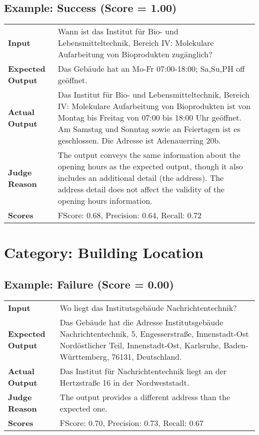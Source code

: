 \documentclass{article}
\begin{document}
\subsection*{Example: Success (Score = 1.00)}
\begin{longtable}{p{} p{}}
\textbf{Input} & Wann ist das Institut für Bio- und Lebensmitteltechnik, Bereich IV: Molekulare Aufarbeitung von Bioprodukten zugänglich? \\
\textbf{Expected Output} & Das Gebäude hat an Mo-Fr 07:00-18:00; Sa,Su,PH off geöffnet. \\
\textbf{Actual Output} & Das Institut für Bio- und Lebensmitteltechnik, Bereich IV: Molekulare Aufarbeitung von Bioprodukten ist von Montag bis Freitag von 07:00 bis 18:00 Uhr geöffnet. Am Samstag und Sonntag sowie an Feiertagen ist es geschlossen. Die Adresse ist Adenauerring 20b. \\
\textbf{Judge Reason} & The output conveys the same information about the opening hours as the expected output, though it also includes an additional detail (the address). The address detail does not affect the validity of the opening hours information. \\
\textbf{Scores} & FScore: 0.68, Precision: 0.64, Recall: 0.72 \\
\end{longtable}
\section*{Category: Building Location}
\subsection*{Example: Failure (Score = 0.00)}
\begin{longtable}{p{} p{}}
\textbf{Input} & Wo liegt das Institutsgebäude Nachrichtentechnik? \\
\textbf{Expected Output} & Das Gebäude hat die Adresse Institutsgebäude Nachrichtentechnik, 5, Engesserstraße, Innenstadt-Ost Nordöstlicher Teil, Innenstadt-Ost, Karlsruhe, Baden-Württemberg, 76131, Deutschland. \\
\textbf{Actual Output} & Das Institut für Nachrichtentechnik liegt an der Hertzstraße 16 in der Nordweststadt. \\
\textbf{Judge Reason} & The output provides a different address than the expected one. \\
\textbf{Scores} & FScore: 0.70, Precision: 0.73, Recall: 0.67 \\
\end{longtable}
\end{document}
